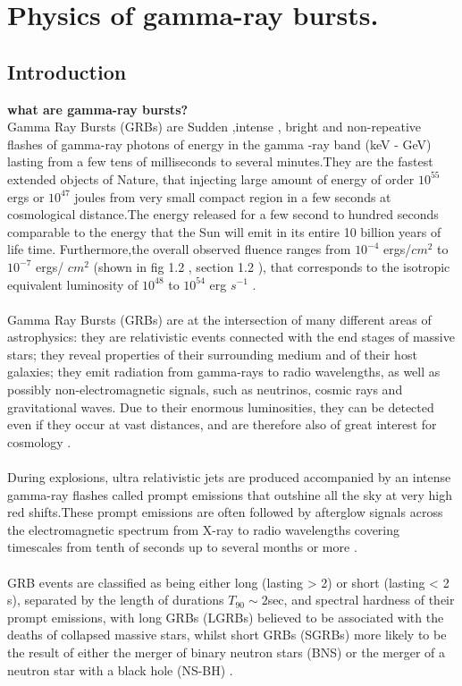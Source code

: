 \setcounter{chapter}{0}
\chapter{Physics of gamma-ray bursts.}
\section{Introduction}
\textbf{what are gamma-ray bursts?}\\
Gamma Ray Bursts (GRBs) are Sudden ,intense , bright and non-repeative flashes of gamma-ray
photons of energy in the gamma -ray band (keV - GeV) lasting from a few tens of milliseconds  to several minutes.They are the fastest extended objects of Nature, that injecting large amount of energy of order $10^{55}$ ergs or $ 10^{47} $ joules from very small compact region in a few seconds at cosmological distance.The energy released for a few second to hundred seconds comparable to the energy that  the Sun will emit in its entire 10 billion years of life time. Furthermore,the overall observed fluence ranges from $10^{-4} $ ergs/$ cm^{2}$ to $ 10^{-7} $ ergs/ $ cm^{2} $ (shown in fig 1.2 , section 1.2 ), that corresponds to the isotropic equivalent luminosity of $ 10^{48} $  to  $10^{54} $ erg $ s^{-1} $ \citep{1}.\\\\
Gamma Ray Bursts (GRBs) are at the intersection of many different areas of astrophysics: they are relativistic events connected with the end stages of massive stars; they reveal properties of their surrounding medium and of their host galaxies; they emit radiation from gamma-rays to radio wavelengths, as well as possibly non-electromagnetic signals, such as neutrinos, cosmic rays and gravitational waves. Due to their enormous luminosities, they can be detected even if they occur at vast distances, and are therefore also of great interest for cosmology \citep{2}.\\\\
 During  explosions, ultra relativistic jets are produced accompanied by an intense gamma-ray flashes called prompt emissions that outshine all the sky at very high red shifts.These prompt emissions are often followed by afterglow signals across the electromagnetic spectrum from X-ray to radio wavelengths covering timescales from tenth of seconds up to several months or more \citep{1,2}.\\\\
GRB  events are  classified   as being  either  long  (lasting > 2) or short (lasting < 2 s), separated  by  the length  of durations $T_{90} \sim 2 $sec, and  spectral hardness of their prompt emissions, with long  GRBs (LGRBs) believed to be associated with the  deaths of collapsed  massive  stars, whilst  short  GRBs (SGRBs) more likely to be  the  result of  either  the  merger of  binary  neutron  stars (BNS) or the  merger  of  a neutron  star  with  a black  hole (NS-BH) \citep{3}.\\\\

